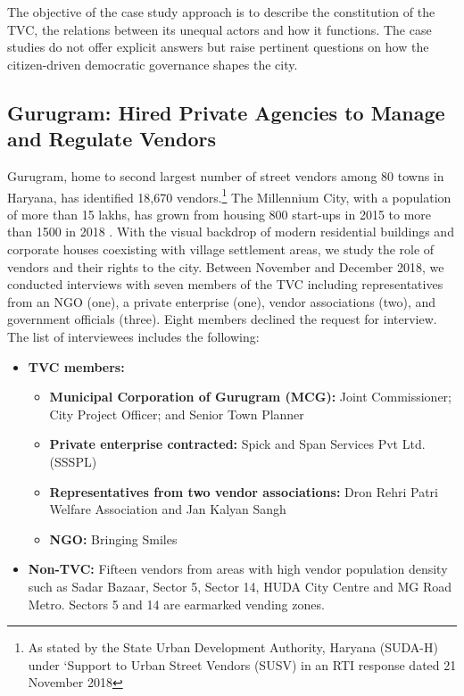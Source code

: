 \documentclass[a4paper, 12pt, twoside]{article}
\begin{document}
{The objective of the case study approach is to describe the constitution of the TVC, the relations between its unequal actors and how it functions. The case studies do not offer explicit answers but raise pertinent questions on how the citizen-driven democratic governance shapes the city.

\subsection*{Gurugram: Hired Private Agencies to Manage and Regulate Vendors}

Gurugram, home to second largest number of street vendors among 80 towns in Haryana, has identified 18,670 vendors.\footnote{As stated by the State Urban Development Authority, Haryana (SUDA-H) under ‘Support to Urban Street Vendors (SUSV) in an RTI response dated 21 November 2018} The Millennium City, with a population of more than 15 lakhs, has grown from housing 800 start-ups in 2015 to more than 1500 in 2018 \parencite{vermanews}. With the visual backdrop of modern residential buildings and corporate houses coexisting with village settlement areas, we study the role of vendors and their rights to the city.
Between November and December 2018, we conducted interviews with seven members of the TVC including representatives from an NGO (one), a private enterprise (one), vendor associations (two), and government officials (three). Eight members declined the request for interview. The list of interviewees includes the following:
\begin{itemize}
\item \textbf{TVC members:}
	\begin{itemize}
	\item \textbf{Municipal Corporation of Gurugram (MCG):} Joint Commissioner; City Project Officer; and Senior Town Planner
	\item \textbf{Private enterprise contracted:} Spick and Span Services Pvt Ltd. (SSSPL)
	\item \textbf{Representatives from two vendor associations:} Dron Rehri Patri Welfare Association and Jan Kalyan Sangh
	\item \textbf{NGO:} Bringing Smiles
	\end{itemize}
\item \textbf{Non-TVC:} Fifteen vendors from areas with high vendor population density such as Sadar Bazaar, Sector 5, Sector 14, HUDA City Centre and MG Road Metro. Sectors 5 and 14 are earmarked vending zones.
\end{itemize}

}
\end{document}
